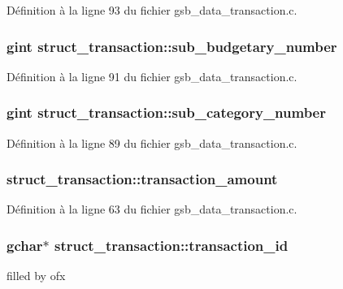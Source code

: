 Définition à la ligne 93 du fichier gsb\_\-data\_\-transaction.c.

\subsubsection[{sub\_\-budgetary\_\-number}]{\setlength{\rightskip}{0pt plus 5cm}gint {\bf struct\_\-transaction::sub\_\-budgetary\_\-number}}\label{structstruct__transaction_a7920b7bbbfebebef989a808e9696062d}


Définition à la ligne 91 du fichier gsb\_\-data\_\-transaction.c.

\subsubsection[{sub\_\-category\_\-number}]{\setlength{\rightskip}{0pt plus 5cm}gint {\bf struct\_\-transaction::sub\_\-category\_\-number}}\label{structstruct__transaction_a2c8422a8cde93c1a0d6cc1c438b6fae4}


Définition à la ligne 89 du fichier gsb\_\-data\_\-transaction.c.

\subsubsection[{transaction\_\-amount}]{ {\bf struct\_\-transaction::transaction\_\-amount}}\label{structstruct__transaction_a347c871548e44d59c83edd08df06c624}


Définition à la ligne 63 du fichier gsb\_\-data\_\-transaction.c.

\subsubsection[{transaction\_\-id}]{\setlength{\rightskip}{0pt plus 5cm}gchar$\ast$ {\bf struct\_\-transaction::transaction\_\-id}}\label{structstruct__transaction_a4307686452f0f8f7fe77687565c22aac}
filled by ofx 

